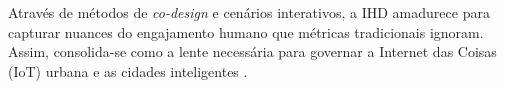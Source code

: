 \documentclass[
	12pt,				%
	oneside,			%
	a4paper,			%
	english,			%
	brazil				%
	]{abntex2ppgsi}
\begin{document}
    Através de métodos de \textit{co-design} e cenários interativos, a IHD amadurece para capturar nuances do engajamento humano que métricas tradicionais ignoram. Assim, consolida-se como a lente necessária para governar a Internet das Coisas (IoT) urbana e as cidades inteligentes \cite{sailaja2021exploring, DOWTHWAITE2024, DeBettio2023, calvetti2024human, Chowdhury2016}.

\end{document}
